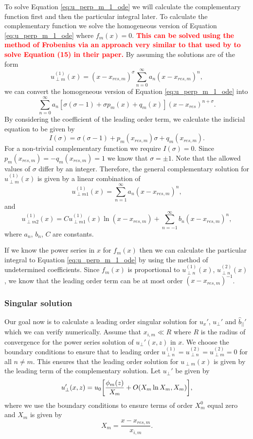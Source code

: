 \documentclass[linenumbers]{aastex63}
\newcommand{\alexedit}[1]{\textcolor{red}{\textbf{#1}}}
\begin{document}
To solve Equation \eqref{eq:u_perp_m_1_ode} we will calculate the complementary function first and then the particular integral later. To calculate the complementary function we solve the homogeneous version of Equation \eqref{eq:u_perp_m_1_ode} where $f_m(x)=0$. \alexedit{This can be solved using the method of Frobenius via an approach very similar to that used by \citet{Soler2013} to solve Equation (15) in their paper.} By assuming the solutions are of the form
\[u_{\perp m}^{(1)}(x) = (x-x_{res,m})^\sigma\sum_{n=0}^\infty a_n(x-x_{res,m})^n,\]
we can convert the homogeneous version of Equation \eqref{eq:u_perp_m_1_ode} into
\[\sum_{n=0}^\infty a_n[\sigma(\sigma-1)+\sigma p_m(x) + q_m(x)](x-x_{res})^{n+\sigma}.\]
By considering the coefficient of the leading order term, we calculate the indicial equation to be given by
\[I(\sigma)=\sigma(\sigma-1)+p_m(x_{res,m})\sigma + q_m(x_{res,m}).\]
For a non-trivial complementary function we require $I(\sigma)=0$. Since $p_m(x_{res,m})=-q_m(x_{res,m})=1$ we know that $\sigma =\pm1$. Note that the allowed values of $\sigma$ differ by an integer. Therefore, the general complementary solution for $u_{\perp m}^{(1)}(x)$ is given by a linear combination of
\begin{equation}
    u_{\perp m 1}^{(1)}(x) = \sum_{n=1}^\infty a_n (x-x_{res,m})^n,
\end{equation}
and
\begin{equation}
    u_{\perp m 2}^{(1)}(x) = Cu_{\perp m 1}^{(1)}(x) \ln(x-x_{res,m}) + \sum_{n=-1}^\infty b_n(x-x_{res,m})^n,
\end{equation}
where $a_n$, $b_n$, $C$ are constants.

If we know the power series in $x$ for $f_m(x)$ then we can calculate the particular integral to Equation \eqref{eq:u_perp_m_1_ode} by using the method of undetermined coefficients. Since $f_m(x)$ is proportional to $u_{\perp n}^{(1)}(x)$, $u_{\perp n}^{(2)}(x)$, we know that the leading order term can be at most order $(x-x_{res,m})^{-1}$.

\subsubsection{Singular solution}

Our goal  now is to calculate a leading order singular solution for $u_x'$, $u_\perp'$ and $\hat{b}_{||}'$ which we can verify numerically.
Assume that $x_{i,m}\ll R$ where $R$ is the radius of convergence for the power series solution of $u_\perp'(x,z)$ in $x$. We choose the boundary conditions to ensure that to leading order $u_{\perp n}^{(1)}=u_{\perp n}^{(2)}=u_{\perp m}^{(2)}=0$ for all $n\ne m$. This ensures that the leading order solution for $u_{\perp m}(x)$ is given by the leading term of the complementary solution. Let $u_\perp'$ be given by
\begin{equation}
    \label{eq:u_perp_singular_soln}
    u_\perp'(x,z) = u_0\qty[\frac{\phi_m(z)}{X_{m}} + O(X_m\ln X_m,X_m)],
\end{equation}
where we use the boundary conditions to ensure terms of order $X_m^0$ equal zero and $X_m$ is given by
\begin{equation}
    X_m=\frac{x - x_{res,m}}{x_{i,m}}.
\end{equation}
\end{document}
